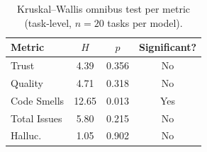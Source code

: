 \begin{table}[t]
\centering
\caption{Kruskal--Wallis omnibus test per metric (task-level, $n=20$ tasks per model).}
\label{tab:significance}
\begin{tabular}{lccc}
\toprule
Metric & $H$ & $p$ & Significant? \\
\midrule
Trust & 4.39 & 0.356 & No \\
Quality & 4.71 & 0.318 & No \\
Code Smells & 12.65 & 0.013 & Yes \\
Total Issues & 5.80 & 0.215 & No \\
Halluc. & 1.05 & 0.902 & No \\
\bottomrule
\end{tabular}
\end{table}